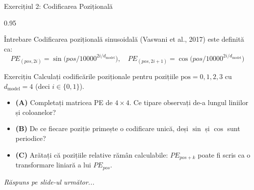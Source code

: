 \documentclass[9pt, aspectratio=169, t]{beamer}
\begin{document}
\begin{frame}{Exercițiul 2: Codificarea Pozițională}
    \begin{cminipage}{0.95\textwidth}
    \begin{alertblock}{Întrebare}
        Codificarea pozițională sinusoidală (Vaswani et al., 2017) este definită ca:
        \[
            PE_{(pos,2i)} = \sin\!\bigl(pos / 10000^{2i/d_{\text{model}}}\bigr), \quad
            PE_{(pos,2i+1)} = \cos\!\bigl(pos / 10000^{2i/d_{\text{model}}}\bigr)
        \]
    \end{alertblock}

    \vspace{0.15cm}

    \begin{block}{Exercițiu}
        Calculați codificările poziționale pentru pozițiile $\text{pos} = 0, 1, 2, 3$ cu $d_{\text{model}} = 4$ (deci $i \in \{0, 1\}$).
        \begin{itemize}\setlength{\itemsep}{3pt}
            \item \textcolor{MainBlue}{\textbf{(A)}} Completați matricea PE de $4 \times 4$. Ce tipare observați de-a lungul liniilor și coloanelor?
            \item \textcolor{MainBlue}{\textbf{(B)}} De ce fiecare poziție primește o codificare unică, deși $\sin$ și $\cos$ sunt periodice?
            \item \textcolor{MainBlue}{\textbf{(C)}} Arătați că pozițiile relative rămân calculabile: $PE_{pos+k}$ poate fi scris ca o transformare liniară a lui $PE_{pos}$.
        \end{itemize}
    \end{block}

    \vspace{0.15cm}

    \begin{center}
        \textit{Răspuns pe slide-ul următor...}
    \end{center}
    \end{cminipage}
\end{frame}
\end{document}
